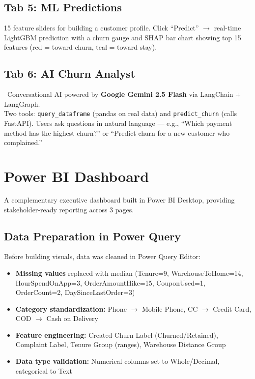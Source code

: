 \documentclass[11pt,a4paper]{article}
\newcommand{\tech}[1]{\texttt{\small\color{primarydark}#1}}
\begin{document}
\subsection{Tab 5: ML Predictions}

15 feature sliders for building a customer profile. Click ``Predict'' $\rightarrow$ real-time LightGBM prediction with a churn gauge and SHAP bar chart showing top 15 features (red = toward churn, teal = toward stay).

\subsection{Tab 6: AI Churn Analyst}

\begin{infobox}
\faRobot\ Conversational AI powered by \textbf{Google Gemini 2.5 Flash} via LangChain + LangGraph.\\[0.2cm]
Two tools: \tech{query\_dataframe} (pandas on real data) and \tech{predict\_churn} (calls FastAPI). Users ask questions in natural language --- e.g., ``Which payment method has the highest churn?'' or ``Predict churn for a new customer who complained.''
\end{infobox}

\section{Power BI Dashboard}

A complementary executive dashboard built in Power BI Desktop, providing stakeholder-ready reporting across 3 pages.

\subsection{Data Preparation in Power Query}

Before building visuals, data was cleaned in Power Query Editor:

\begin{itemize}[leftmargin=*, label=\textcolor{primary}{\faCog}]
    \item \textbf{Missing values} replaced with median (Tenure=9, WarehouseToHome=14, HourSpendOnApp=3, OrderAmountHike=15, CouponUsed=1, OrderCount=2, DaySinceLastOrder=3)
    \item \textbf{Category standardization:} Phone $\rightarrow$ Mobile Phone, CC $\rightarrow$ Credit Card, COD $\rightarrow$ Cash on Delivery
    \item \textbf{Feature engineering:} Created Churn Label (Churned/Retained), Complaint Label, Tenure Group (ranges), Warehouse Distance Group
    \item \textbf{Data type validation:} Numerical columns set to Whole/Decimal, categorical to Text
\end{itemize}
\end{document}
